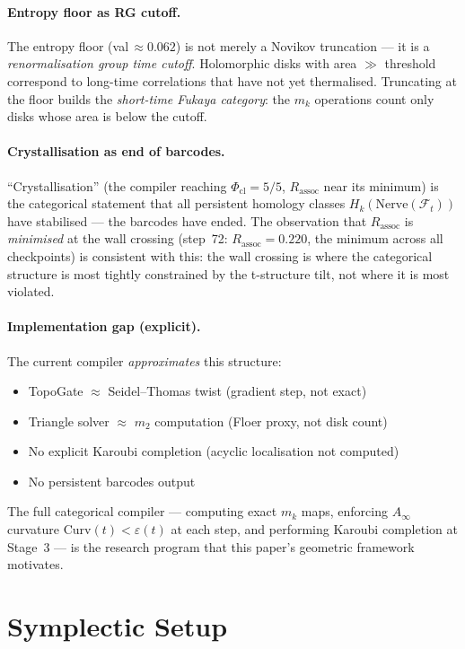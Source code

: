 \documentclass[11pt]{amsart}
\begin{document}
\paragraph{Entropy floor as RG cutoff.}
The entropy floor (val\,$\approx 0.062$) is not merely a Novikov
truncation --- it is a \emph{renormalisation group time cutoff}.
Holomorphic disks with area $\gg$ threshold correspond to long-time
correlations that have not yet thermalised.
Truncating at the floor builds the \emph{short-time Fukaya category}:
the $m_k$ operations count only disks whose area is below the cutoff.

\paragraph{Crystallisation as end of barcodes.}
``Crystallisation'' (the compiler reaching $\Phi$$_\mathrm{cl} = 5/5$,
$R_\mathrm{assoc}$ near its minimum) is the categorical statement that
all persistent homology classes $H_k(\mathrm{Nerve}(\mathcal{F}_t))$
have stabilised --- the barcodes have ended.
The observation that $R_\mathrm{assoc}$ is \emph{minimised} at the
wall crossing (step~72: $R_\mathrm{assoc} = 0.220$, the minimum across
all checkpoints) is consistent with this: the wall crossing is where
the categorical structure is most tightly constrained by the t-structure
tilt, not where it is most violated.

\paragraph{Implementation gap (explicit).}
The current compiler \emph{approximates} this structure:
\begin{itemize}
\item TopoGate $\approx$ Seidel--Thomas twist (gradient step, not exact)
\item Triangle solver $\approx$ $m_2$ computation (Floer proxy, not disk count)
\item No explicit Karoubi completion (acyclic localisation not computed)
\item No persistent barcodes output
\end{itemize}
The full categorical compiler --- computing exact $m_k$ maps,
enforcing $A_\infty$ curvature $\mathrm{Curv}(t) < \varepsilon(t)$ at each step,
and performing Karoubi completion at Stage~3 --- is the research program
that this paper's geometric framework motivates.

\section{Symplectic Setup}
\label{sec:symplectic}
\end{document}
